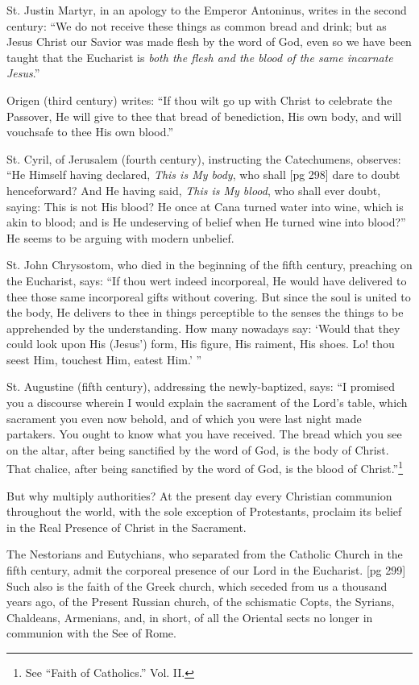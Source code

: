 St. Justin Martyr, in an apology to the Emperor
Antoninus, writes in the second century:
“We do not receive these things as common bread
and drink; but as Jesus Christ our Savior was
made flesh by the word of God, even so we have
been taught that the Eucharist is \emph{both the flesh and
the blood of the same incarnate Jesus}.”

Origen (third century) writes: “If thou wilt go
up with Christ to celebrate the Passover, He will
give to thee that bread of benediction, His own
body, and will vouchsafe to thee His own blood.”

St. Cyril, of Jerusalem (fourth century), instructing
the Catechumens, observes: “He Himself
having declared, \emph{This is My body}, who shall
[pg 298]
dare to doubt henceforward? And He having
said, \emph{This is My blood}, who shall ever doubt, saying:
This is not His blood? He once at Cana
turned water into wine, which is akin to blood;
and is He undeserving of belief when He turned
wine into blood?” He seems to be arguing with
modern unbelief.

St. John Chrysostom, who died in the beginning
of the fifth century, preaching on the Eucharist,
says: “If thou wert indeed incorporeal, He would
have delivered to thee those same incorporeal gifts
without covering. But since the soul is united to
the body, He delivers to thee in things perceptible
to the senses the things to be apprehended by the
understanding. How many nowadays say: ‘Would
that they could look upon His (Jesus') form, His
figure, His raiment, His shoes. Lo! thou seest
Him, touchest Him, eatest Him.’ ”

St. Augustine (fifth century), addressing the
newly-baptized, says: “I promised you a discourse
wherein I would explain the sacrament of
the Lord's table, which sacrament you even now
behold, and of which you were last night made partakers.
You ought to know what you have received.
The bread which you see on the altar,
after being sanctified by the word of God, is the
body of Christ. That chalice, after being sanctified
by the word of God, is the blood of Christ.”\footnote{See
“Faith of Catholics.” Vol. II.}

But why multiply authorities? At the present
day every Christian communion throughout the
world, with the sole exception of Protestants, proclaim
its belief in the Real Presence of Christ in
the Sacrament.

The Nestorians and Eutychians, who separated
from the Catholic Church in the fifth century, admit
the corporeal presence of our Lord in the Eucharist.
[pg 299]
Such also is the faith of the Greek church,
which seceded from us a thousand years ago, of
the Present Russian church, of the schismatic
Copts, the Syrians, Chaldeans, Armenians, and, in
short, of all the Oriental sects no longer in communion
with the See of Rome.

